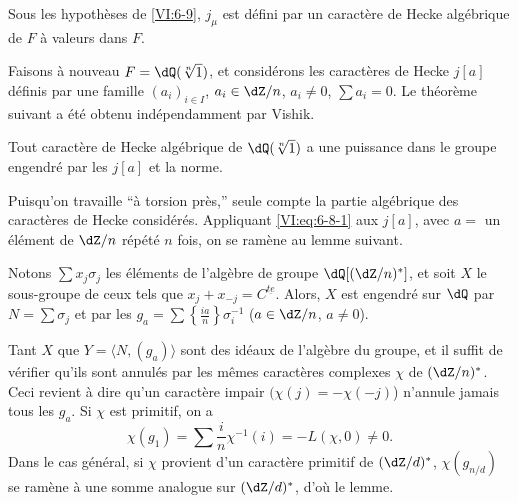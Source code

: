 \begin{proposition_}\label{VI:6-10}
Sous les hypothèses de \ref{VI:6-9}, $j_\mu$ est défini par un caractère 
de Hecke algébrique de $F$ à valeurs dans $F$. 
\end{proposition_}

Faisons à nouveau $F=\dQ(\sqrt[n]{1})$, et considérons les caractères de 
Hecke $j[a]$ définis par une famille $(a_i)_{i\in I}$, $a_i\in \dZ/n$, 
$a_i\ne 0$, $\sum a_i=0$. Le théorème suivant a été obtenu 
indépendamment par Vishik. 





\begin{theorem_}\label{VI:6-11}
Tout caractère de Hecke algébrique de $\dQ(\sqrt[n]{1})$ a une puissance 
dans le groupe engendré par les $j[a]$ et la norme. 
\end{theorem_}

Puisqu'on travaille ``à torsion près,'' seule compte la partie algébrique 
des caractères de Hecke considérés. Appliquant \eqref{VI:eq:6-8-1} aux 
$j[a]$, avec $a=$ un élément de $\dZ/n$ répété $n$ fois, on se 
ramène au lemme suivant.





\begin{lemma_}\label{VI:6-12}
Notons $\sum x_j \sigma_j$ les éléments de l'algèbre de groupe 
$\dQ[(\dZ/n)^\ast]$, et soit $X$ le sous-groupe de ceux tels que 
$x_j+x_{-j}=C^{\underline{t e}}$. Alors, $X$ est engendré sur $\dQ$ par 
$N=\sum \sigma_j$ et par les 
$g_a=\sum \left\{ \frac{i a}{n}\right\} \sigma_i^{-1}$ 
($a\in \dZ/n$, $a\ne 0$). 
\end{lemma_}

Tant $X$ que $Y=\langle N,(g_a)\rangle$ sont des idéaux de l'algèbre du 
groupe, et il suffit de vérifier qu'ils sont annulés par les mêmes 
caractères complexes $\chi$ de $(\dZ/n)^\ast$. Ceci revient à dire qu'un 
caractère impair $(\chi(j)=-\chi(-j)$) n'annule jamais tous les $g_a$. Si 
$\chi$ est primitif, on a 
\[
  \chi(g_1) = \sum \frac i n \chi^{-1}(i) = -L(\chi,0)\ne 0 \text{.} 
\]
Dans le cas général, si $\chi$ provient d'un caractère primitif de 
$(\dZ/d)^\ast$, $\chi(g_{n/d})$ se ramène à une somme analogue sur 
$(\dZ/d)^\ast$, d'où le lemme. 











